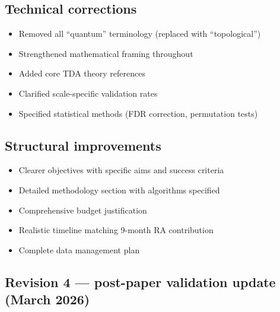 \subsection{Technical corrections}

\begin{itemize}
  \item Removed all ``quantum'' terminology (replaced with ``topological'')
  \item Strengthened mathematical framing throughout
  \item Added core TDA theory references
  \item Clarified scale-specific validation rates
  \item Specified statistical methods (FDR correction, permutation tests)
\end{itemize}

\subsection{Structural improvements}

\begin{itemize}
  \item Clearer objectives with specific aims and success criteria
  \item Detailed methodology section with algorithms specified
  \item Comprehensive budget justification
  \item Realistic timeline matching 9-month RA contribution
  \item Complete data management plan
\end{itemize}

\subsection{Revision 4 --- post-paper validation update (March 2026)}


